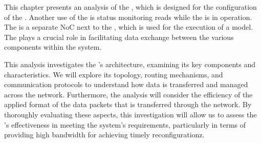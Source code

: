 This chapter presents an analysis of the \confignoc{}, which is designed for the configuration of the \graicore{}.
Another use of the \confignoc{} is status monitoring reads while the \graicore{} is in operation.
The \confignoc{} is a separate NoC next to the \eventnoc{}, which is used for the execution of a model.
The \confignoc{} plays a crucial role in facilitating data exchange between the various components within the system.

This analysis investigates the \confignoc{}'s architecture, examining its key components and characteristics.
We will explore its topology, routing mechanisms, and communication protocols to understand how data is transferred and managed across the network.
Furthermore, the analysis will consider the efficiency of the applied format of the data packets that is transferred through the network.  
By thoroughly evaluating these aspects, this investigation will allow us to assess the \confignoc{}'s effectiveness in meeting the system's requirements, particularly in terms of providing high bandwidth for achieving timely reconfigurationz.

